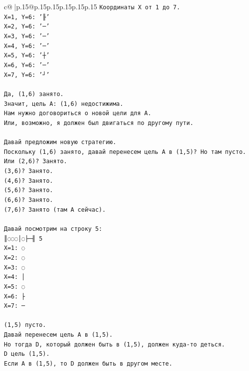 \documentclass{article}
\begin{document}
{\begin{supertabular}{c@{$\;$}|p{.15\linewidth}@{}p{.15\linewidth}p{.15\linewidth}p{.15\linewidth}p{.15\linewidth}p{.15\linewidth}}
{{{\texttt{Координаты X от 1 до 7.} \\
\texttt{X=1, Y=6: '╟'} \\
\texttt{X=2, Y=6: '─'} \\
\texttt{X=3, Y=6: '─'} \\
\texttt{X=4, Y=6: '─'} \\
\texttt{X=5, Y=6: '┼'} \\
\texttt{X=6, Y=6: '─'} \\
\texttt{X=7, Y=6: '┘'} \\
\\ 
\texttt{Да, (1,6) занято.} \\
\texttt{Значит, цель A: (1,6) недостижима.} \\
\texttt{Нам нужно договориться о новой цели для A.} \\
\texttt{Или, возможно, я должен был двигаться по другому пути.} \\
\\ 
\texttt{Давай предложим новую стратегию.} \\
\texttt{Поскольку (1,6) занято, давай перенесем цель A в (1,5)? Но там пусто.} \\
\texttt{Или (2,6)? Занято.} \\
\texttt{(3,6)? Занято.} \\
\texttt{(4,6)? Занято.} \\
\texttt{(5,6)? Занято.} \\
\texttt{(6,6)? Занято.} \\
\texttt{(7,6)? Занято (там A сейчас).} \\
\\ 
\texttt{Давай посмотрим на строку 5:} \\
\texttt{║◌◌◌│◌├─╢ 5} \\
\texttt{X=1: ◌} \\
\texttt{X=2: ◌} \\
\texttt{X=3: ◌} \\
\texttt{X=4: │} \\
\texttt{X=5: ◌} \\
\texttt{X=6: ├} \\
\texttt{X=7: ─} \\
\\ 
\texttt{(1,5) пусто.} \\
\texttt{Давай перенесем цель A в (1,5).} \\
\texttt{Но тогда D, который должен быть в (1,5), должен куда{-}то деться.} \\
\texttt{D цель (1,5).} \\
\texttt{Если A в (1,5), то D должен быть в другом месте.} \\
}}}
\end{supertabular}}
\end{document}
